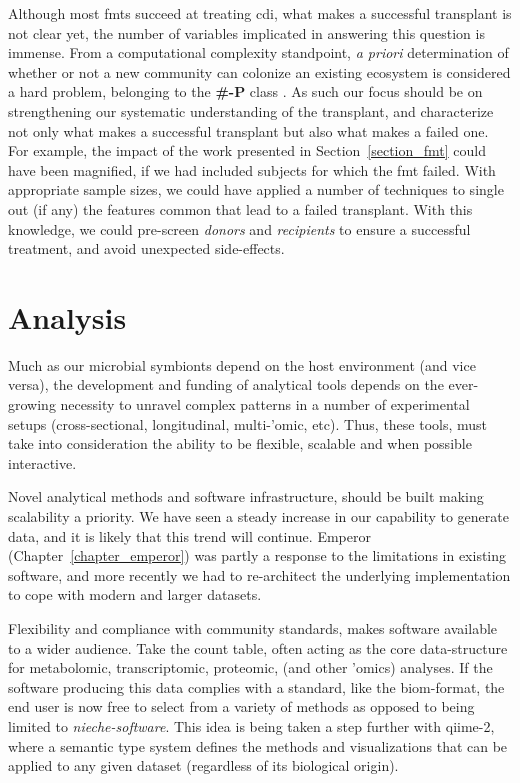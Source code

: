 Although most \glspl{fmt} succeed at treating \gls{cdi}, what makes a
successful transplant is not clear yet, the number of variables implicated in
answering this question is immense. From a computational complexity standpoint,
\textit{a priori} determination of whether or not a new community can colonize 
an existing ecosystem is considered a hard problem, belonging to the 
\textbf{\#-P} class \cite{RN4266}. As such our focus should be on strengthening 
our systematic understanding of the transplant, and characterize not only what 
makes a successful transplant but also what makes a failed one.  For example, 
the impact of the work presented in Section~\ref{section_fmt} could have been 
magnified, if we had included subjects for which the \gls{fmt} failed. With 
appropriate sample sizes, we could have applied a number of techniques to 
single out (if any) the features common that lead to a failed transplant. With 
this knowledge, we could pre-screen \textit{donors} and \textit{recipients} to 
ensure a successful treatment, and avoid unexpected side-effects.

\section{Analysis}

Much as our microbial symbionts depend on the host environment (and vice
versa), the development and funding of analytical tools depends on the
ever-growing necessity to unravel complex patterns in a number of experimental
setups (cross-sectional, longitudinal, multi-'omic, etc). Thus, these tools,
must take into consideration the ability to be flexible, scalable and when
possible interactive.

Novel analytical methods and software infrastructure, should be built making 
scalability a priority.  We have seen a steady increase in our capability to 
generate data, and it is likely that this trend will continue. Emperor 
(Chapter~\ref{chapter_emperor}) was partly a response to the limitations in 
existing software, and more recently we had to re-architect the underlying 
implementation to cope with modern and larger datasets.

Flexibility and compliance with community standards, makes software available
to a wider audience. Take the count table, often acting as the core
data-structure for metabolomic, transcriptomic, proteomic, (and other 'omics)
analyses. If the software producing this data complies with a standard, like
the \gls{biom}-format, the end user is now free to select from a variety of
methods as opposed to being limited to \textit{nieche-software}. This idea is 
being taken a step further with \gls{qiime}-2, where a semantic type system 
defines the methods and visualizations that can be applied to any given dataset 
(regardless of its biological origin).

